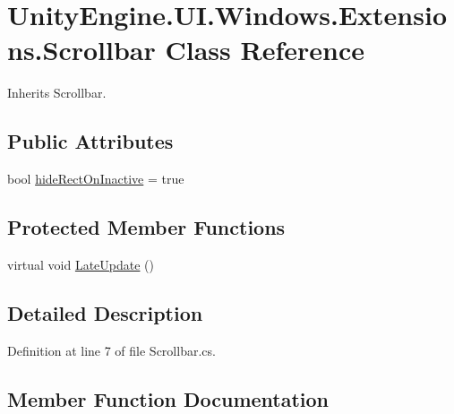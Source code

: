 \hypertarget{class_unity_engine_1_1_u_i_1_1_windows_1_1_extensions_1_1_scrollbar}{}\section{Unity\+Engine.\+U\+I.\+Windows.\+Extensions.\+Scrollbar Class Reference}
\label{class_unity_engine_1_1_u_i_1_1_windows_1_1_extensions_1_1_scrollbar}


Inherits Scrollbar.

\subsection*{Public Attributes}
\begin{DoxyCompactItemize}
\item 
bool \hyperlink{class_unity_engine_1_1_u_i_1_1_windows_1_1_extensions_1_1_scrollbar_a59957c10b7f04fc00e19ca198aab8e3f}{hide\+Rect\+On\+Inactive} = true
\end{DoxyCompactItemize}
\subsection*{Protected Member Functions}
\begin{DoxyCompactItemize}
\item 
virtual void \hyperlink{class_unity_engine_1_1_u_i_1_1_windows_1_1_extensions_1_1_scrollbar_a008a595c38569152810698c6ebbc1839}{Late\+Update} ()
\end{DoxyCompactItemize}


\subsection{Detailed Description}


Definition at line 7 of file Scrollbar.\+cs.



\subsection{Member Function Documentation}
\hypertarget{class_unity_engine_1_1_u_i_1_1_windows_1_1_extensions_1_1_scrollbar_a008a595c38569152810698c6ebbc1839}{}
